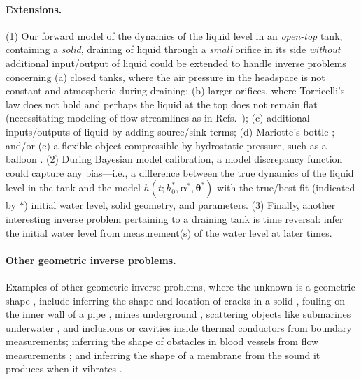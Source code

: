 \documentclass[openacc]{rsproca_new}%
\begin{document}
\paragraph{Extensions.}
(1) Our forward model of the dynamics of the liquid level in an \emph{open-top} tank, containing a \emph{solid}, draining of liquid through a \emph{small} orifice in its side \emph{without} additional input/output of liquid could be extended to handle inverse problems concerning
(a) closed tanks, where the air pressure in the headspace is not constant and atmospheric during draining; 
(b) larger orifices, where Torricelli's law does not hold and perhaps the liquid at the top does not remain flat (necessitating modeling of flow streamlines as in Refs.~\cite{mathew2014numerical,sakri2017numerical});
(c) additional inputs/outputs of liquid by adding source/sink terms; 
(d) Mariotte's bottle \cite{kirevs2006mariotte}; and/or
(e) a flexible object compressible by hydrostatic pressure, such as a balloon \cite{muller2004rubber}. 
(2) During Bayesian model calibration, a model discrepancy \cite{brynjarsdottir2014learning,kennedy2001bayesian} function could capture any bias---i.e., a difference between the true dynamics of the liquid level in the tank and the model $h(t; h_0^*,  \boldsymbol \alpha^*, \boldsymbol \theta^*)$ with the true/best-fit (indicated by $*$) initial water level, solid geometry, and parameters.
(3) Finally, another interesting inverse problem pertaining to a draining tank is time reversal: infer the initial water level from measurement(s) of the water level at later times.

\paragraph{Other geometric inverse problems.}
Examples of other geometric inverse problems, where the unknown is a geometric shape \cite{ameur2004level,burger2001level,harbrecht2013numerical}, include inferring the shape and location of cracks in a solid \cite{nishimura1991boundary}, fouling on the inner wall of a pipe \cite{chen2011inverse}, mines underground \cite{delbary2007inverse,lopez2003detection}, scattering objects like submarines \cite{yaman2013survey} underwater \cite{buchanan2004marine}, and inclusions or cavities inside thermal conductors \cite{wang2018numerical,nakamura2015reconstruction}
 from boundary measurements; inferring the shape of obstacles in blood vessels from flow measurements \cite{aguayo2021distributed,nolte2022inverse}; and inferring the shape of a membrane from the sound it produces when it vibrates \cite{kac1966can}.
\end{document}

